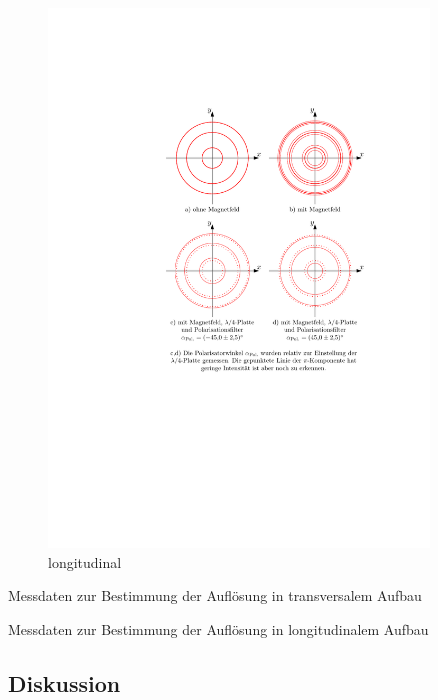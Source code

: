 \documentclass[11pt, a4paper]{article}
\begin{document}
\begin{figure}[h]
	\centering
	\includegraphics[width=0.9\textwidth]{./figures/zeeman_longitudinal.pdf}
	\caption{longitudinal}
	\label{fig:zeeman_longitudinal}
\end{figure}

\begin{table}[h]
	\centering
	
	\caption{Messdaten zur Bestimmung der Auflösung in transversalem Aufbau}
	\label{tab:aufloesung_transversal}
\end{table}

\begin{table}[h]
	\centering
	
	\caption{Messdaten zur Bestimmung der Auflösung in longitudinalem Aufbau}
	\label{tab:aufloesung_longitudinal}
\end{table}

\subsection{Diskussion}
\end{document}
